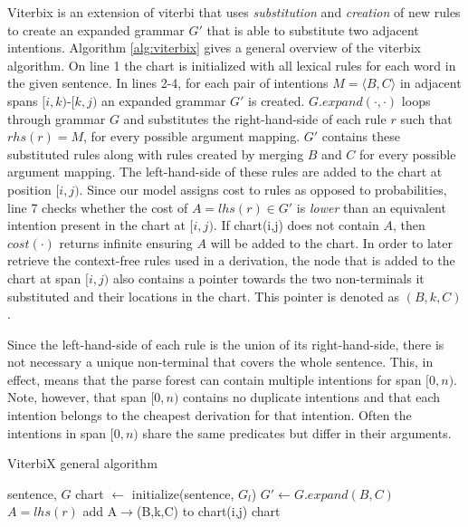 \documentclass[a4paper]{article}
\begin{document}
Viterbix is an extension of viterbi that uses \textit{substitution} and \textit{creation} of new rules to create an expanded grammar $G'$ that is able to substitute two adjacent intentions. Algorithm \ref{alg:viterbix} gives a general overview of the viterbix algorithm. On line 1 the chart is initialized with all lexical rules for each word in the given sentence. In lines 2-4, for each pair of intentions $M = \langle B, C \rangle$ in adjacent spans $[i,k)$-$[k,j)$ an expanded grammar $G'$ is created. $G.expand(\cdot, \cdot)$ loops through grammar $G$ and substitutes the right-hand-side of each rule $r$ such that $rhs(r) = M$, for every possible argument mapping. $G'$ contains these substituted rules along with rules created by merging $B$ and $C$ for every possible argument mapping. The left-hand-side of these rules are added to the chart at position $[i,j)$. Since our model assigns cost to rules as opposed to probabilities, line 7 checks whether the cost of $A = lhs(r) \in G'$ is \textit{lower} than an equivalent intention present in the chart at $[i,j)$. If chart(i,j) does not contain $A$, then $cost(\cdot)$ returns infinite ensuring $A$ will be added to the chart.  In order to later retrieve the context-free rules used in a derivation, the node that is added to the chart at span $[i,j)$ also contains a pointer towards the two non-terminals it substituted and their locations in the chart. This pointer is denoted as $(B,k,C)$.

Since the left-hand-side of each rule is the union of its right-hand-side, there is not necessary a unique non-terminal that covers the whole sentence. This, in effect, means that the parse forest can contain multiple intentions for span $[0,n)$. Note, however, that span $[0,n)$ contains no duplicate intentions and that each intention belongs to the cheapest derivation for that intention. Often the intentions in span $[0,n)$ share the same predicates but differ in their arguments. 


\begin{algorithm}
\caption{ViterbiX general algorithm}
\begin{algorithmic}[1]
\REQUIRE sentence, $G$
\STATE chart $\leftarrow$ initialize(sentence, $G_l$)
        \STATE $G' \leftarrow G.expand(B, C)$
            \STATE $A = lhs(r)$
                \STATE add A$\rightarrow$(B,k,C) to chart(i,j)
            \ENDIF
        \ENDFOR
    \ENDFOR
\ENDFOR
\RETURN chart
\end{algorithmic}
\label{alg:viterbix}
\end{algorithm}
\end{document}
